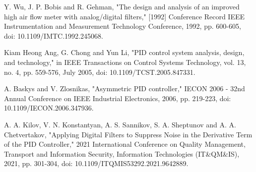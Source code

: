 \documentclass[conference]{IEEEtran}
\begin{document}
\begin{thebibliography}{00}
 Y. Wu, J. P. Bobis and R. Gehman, "The design and analysis of an improved high air flow meter with analog/digital filters," [1992] Conference Record IEEE Instrumentation and Measurement Technology Conference, 1992, pp. 600-605, doi: 10.1109/IMTC.1992.245068.

Kiam Heong Ang, G. Chong and Yun Li, "PID control system analysis, design, and technology," in IEEE Transactions on Control Systems Technology, vol. 13, no. 4, pp. 559-576, July 2005, doi: 10.1109/TCST.2005.847331.

A. Baskys and V. Zlosnikas, "Asymmetric PID controller," IECON 2006 - 32nd Annual Conference on IEEE Industrial Electronics, 2006, pp. 219-223, doi: 10.1109/IECON.2006.347936.

 A. A. Kilov, V. N. Konstantyan, A. S. Sannikov, S. A. Sheptunov and A. A. Chetvertakov, "Applying Digital Filters to Suppress Noise in the Derivative Term of the PID Controller," 2021 International Conference on Quality Management, Transport and Information Security, Information Technologies (IT&QM&IS), 2021, pp. 301-304, doi: 10.1109/ITQMIS53292.2021.9642889.



\end{thebibliography}
\end{document}
